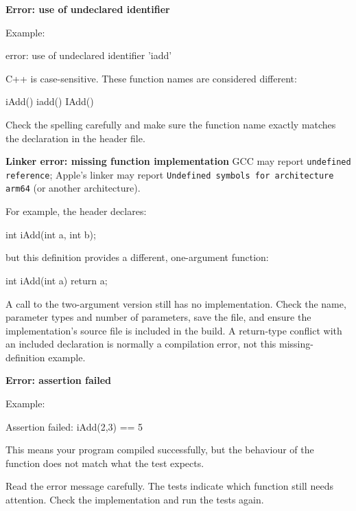 \documentclass{csc2059practical}
\begin{document}
\begin{commonerror}
\textbf{Error: use of undeclared identifier}

Example:

\begin{terminal}
error: use of undeclared identifier 'iadd'
\end{terminal}

C++ is case-sensitive. These function names are considered different:

\begin{cppcode}
iAdd()
iadd()
IAdd()
\end{cppcode}

Check the spelling carefully and make sure the function name exactly matches the declaration in the header file.
\end{commonerror}

\begin{commonerror}
\textbf{Linker error: missing function implementation}
GCC may report \texttt{undefined reference}; Apple's linker may report \texttt{Undefined symbols for architecture arm64} (or another architecture).

For example, the header declares:
\begin{cppcode}
int iAdd(int a, int b);
\end{cppcode}
but this definition provides a different, one-argument function:
\begin{cppcode}
int iAdd(int a) { return a; }
\end{cppcode}
A call to the two-argument version still has no implementation. Check the name, parameter types and number of parameters, save the file, and ensure the implementation's source file is included in the build. A return-type conflict with an included declaration is normally a compilation error, not this missing-definition example.
\end{commonerror}

\begin{commonerror}
\textbf{Error: assertion failed}

Example:

\begin{terminal}
Assertion failed:
iAdd(2,3) == 5
\end{terminal}

This means your program compiled successfully, but the behaviour of the function does not match what the test expects.

Read the error message carefully. The tests indicate which function still needs attention. Check the implementation and run the tests again.
\end{commonerror}
\end{document}
